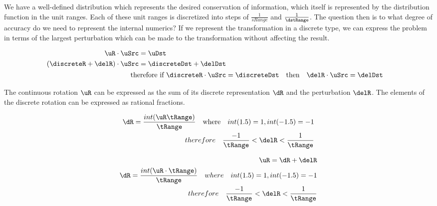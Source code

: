 We have a well-defined distribution which represents the desired conservation of information, which itself is represented by the distribution function in the unit ranges. Each of these unit ranges is discretized into steps of $\frac{1}{sRange}$ and $\frac{1}{\dstRange}$. The question then is to what degree of accuracy do we need to represent the internal numerics? If we represent the transformation in a discrete type, we can express the problem in terms of the largest perturbation which can be made to the transformation without affecting the result.


\begin{eqnarray}\label{eq:lxyPixel}
\begin{aligned}
\uR  \cdot \uSrc &= \uDst  \\
(\discreteR + \delR)  \cdot \uSrc &= \discreteDst + \delDst \\
\end{aligned} \\
\text{therefore if } \discreteR \cdot \uSrc &= \discreteDst \quad \text{then}\quad \delR  \cdot \uSrc = \delDst
\end{eqnarray}

The continuous rotation $\uR$ can be expressed as the sum of its discrete representation $\dR$ and the perturbation $\delR$. The elements of the discrete rotation can be expressed as rational fractions.

\begin{eqnarray}\label{eq:dRot}
\dR = \dfrac{int(\uR \tRange)}{\tRange}\quad \text{where}\quad int(1.5) = 1, int (-1.5) = -1\\
therefore\quad \dfrac{-1}{\tRange} < \delR  < \dfrac{1}{\tRange}
\end{eqnarray}

\begin{eqnarray}\label{eq:dRRange}
\uR = \dR + \delR\\
\dR = \dfrac{int(\uR \cdot \tRange)}{\tRange}\quad where\quad int(1.5) = 1, int (-1.5) = -1\\
therefore\quad \dfrac{-1}{\tRange} < \delR  < \dfrac{1}{\tRange}
\end{eqnarray}

